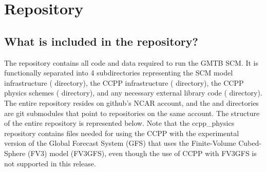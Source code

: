 \chapter{Repository}
\label{chapter: repository}
\setlength{\parskip}{12pt}



\section{What is included in the repository?}

The repository contains all code and data required to run the GMTB SCM. It is functionally separated into 4 subdirectories representing the SCM model infrastructure ( directory), the CCPP infrastructure ( directory), the CCPP physics schemes ( directory), and any necessary external library code ( directory). The entire  repository resides on github's NCAR account, and the  and  directories are git submodules that point to repositories on the same account. The structure of the entire repository is represented below. Note that the ccpp\_physics repository contains files needed for using the CCPP with the experimental version of the Global Forecast System (GFS) that uses the Finite-Volume Cubed-Sphere (FV3) model (FV3GFS), even though the use of CCPP with FV3GFS is not supported in this release.

